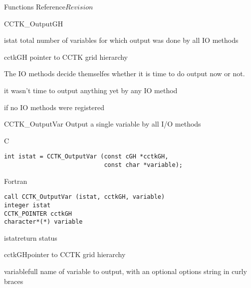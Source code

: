 \begin{cactuspart}{ Functions Reference}{}{$Revision$}
\begin{FunctionDescription}{CCTK\_OutputGH}
\begin{ParameterSection}
\begin{Parameter}{istat}
total number of variables for which output was done by all IO methods
\end{Parameter}
\begin{Parameter}{cctkGH}
pointer to CCTK grid hierarchy
\end{Parameter}
\end{ParameterSection}

\begin{Discussion}
The IO methods decide themselfes whether it is time to do output now or not.
\end{Discussion}

\begin{ErrorSection}
\begin{Error}{0}
it wasn't time to output anything yet by any IO method
\end{Error}
\begin{Error}{-1}
if no IO methods were registered
\end{Error}
\end{ErrorSection}
\end{FunctionDescription}


\begin{FunctionDescription}{CCTK\_OutputVar}
Output a single variable by all I/O methods
\label{CCTK-OutputVar}

\begin{SynopsisSection}
\begin{Synopsis}{C}
\begin{verbatim}
int istat = CCTK_OutputVar (const cGH *cctkGH,
                            const char *variable);
\end{verbatim}
\end{Synopsis}
\begin{Synopsis}{Fortran}
\begin{verbatim}
call CCTK_OutputVar (istat, cctkGH, variable)
integer istat
CCTK_POINTER cctkGH
character*(*) variable
\end{verbatim}
\end{Synopsis}
\end{SynopsisSection}

\begin{ParameterSection}
\begin{Parameter}{istat}return status\end{Parameter}
\begin{Parameter}{cctkGH}pointer to CCTK grid hierarchy\end{Parameter}
\begin{Parameter}{variable}full name of variable to output, with an optional
options string in curly braces\end{Parameter}
\end{ParameterSection}


\end{FunctionDescription}
\end{cactuspart}
